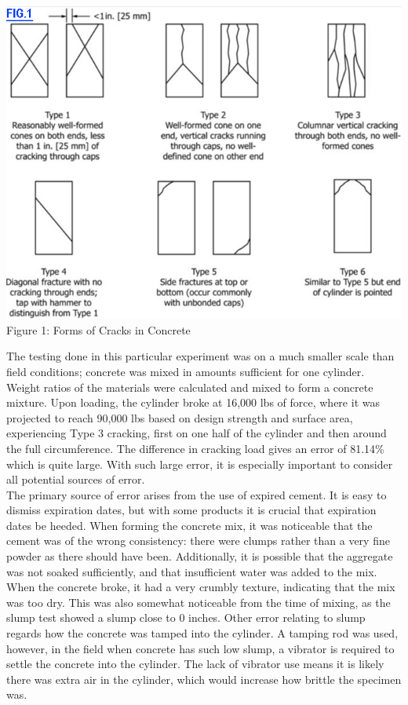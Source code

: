 \documentclass{article}
\begin{document}
    \begin{center}
        \includegraphics[scale=0.5, frame]{fig1.png}
        \\Figure 1: Forms of Cracks in Concrete\\
    \end{center}
    \par The testing done in this particular experiment was on a much smaller scale than field conditions; concrete was mixed in amounts sufficient for one cylinder. Weight ratios of the materials were calculated and mixed to form a concrete mixture. Upon loading, the cylinder broke at 16,000 lbs of force, where it was projected to reach 90,000 lbs based on design strength and surface area, experiencing Type 3 cracking, first on one half of the cylinder and then around the full circumference. The difference in cracking load gives an error of 81.14\% which is quite large. With such large error, it is especially important to consider all potential sources of error. \\
    \indent The primary source of error arises from the use of expired cement. It is easy to dismiss expiration dates, but with some products it is crucial that expiration dates be heeded. When forming the concrete mix, it was noticeable that the cement was of the wrong consistency: there were clumps rather than a very fine powder as there should have been. Additionally, it is possible that the aggregate was not soaked sufficiently, and that insufficient water was added to the mix. When the concrete broke, it had a very crumbly texture, indicating that the mix was too dry. This was also somewhat noticeable from the time of mixing, as the slump test showed a slump close to 0 inches. Other error relating to slump regards how the concrete was tamped into the cylinder. A tamping rod was used, however, in the field when concrete has such low slump, a vibrator is required to settle the concrete into the cylinder. The lack of vibrator use means it is likely there was extra air in the cylinder, which would increase how brittle the specimen was. \\
\end{document}
